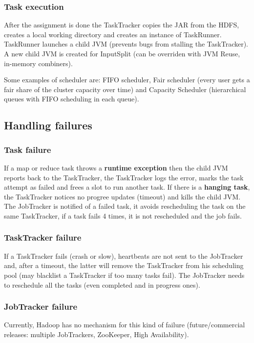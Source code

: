		\subsubsection{Task execution}
			\par
			After the assignment is done the TaskTracker copies the JAR from the HDFS, creates a local working directory and creates an instance of TaskRunner.
			\newline
			TaskRunner launches a child JVM (prevents bugs from stalling the TaskTracker). A new child JVM is created for InputSplit (can be overriden with JVM Reuse, in-memory combiners).
			\newline
		\par\noindent
		Some examples of scheduler are: FIFO scheduler, Fair scheduler (every user gets a fair share of the cluster capacity over time) and Capacity Scheduler (hierarchical queues with FIFO scheduling in each queue).
	\subsection{Handling failures}
		\subsubsection{Task failure}
			\par
			If a map or reduce task throws a \textbf{runtime exception} then the child JVM reports back to the TaskTracker, the TaskTracker logs the error, marks the task attempt as failed and frees a slot to run another task.
			\newline
			If there is a \textbf{hanging task}, the TaskTracker notices no progree updates (timeout) and kills the child JVM.
			\newline
			The JobTracker is notified of a failed task, it avoids rescheduling the task on the same TaskTracker, if a task fails 4 times, it is not rescheduled and the job fails.
		\subsubsection{TaskTracker failure}
			\par
			If a TaskTracker fails (crash or slow), heartbeats are not sent to the JobTracker and, after a timeout, the latter will remove the TaskTracker from his scheduling pool (may blacklist a TaskTracker if too many tasks fail).
			\newline
			The JobTracker needs to reschedule all the tasks (even completed and in progress ones).
		\subsubsection{JobTracker failure}
			\par
			Currently, Hadoop has no mechanism for this kind of failure (future/commercial releases: multiple JobTrackers, ZooKeeper, High Availability).
